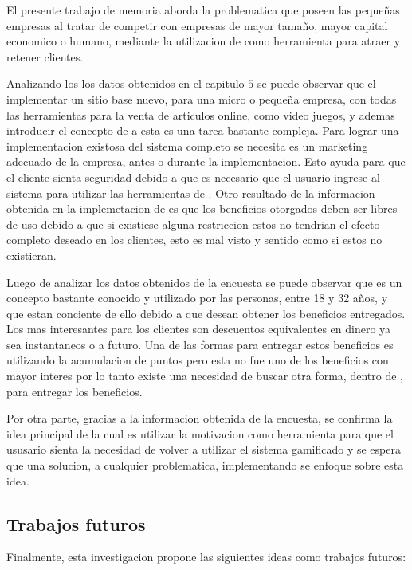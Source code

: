 El presente trabajo de memoria aborda la problematica que poseen las pequeñas empresas al tratar
de competir con empresas de mayor tamaño, mayor capital economico o humano, mediante la utilizacion
de {\GAM} como herramienta para atraer y retener clientes.

Analizando los los datos obtenidos en el capitulo $5$ se puede observar que el implementar un sitio base 
nuevo, para una micro o pequeña empresa, con todas las herramientas para la venta de articulos online, 
como video juegos, y ademas introducir el concepto de {\GAM} a esta es una tarea bastante compleja. 
Para lograr una implementacion existosa del sistema completo se necesita es un marketing adecuado 
de la empresa, antes o durante la implementacion. Esto ayuda para que el cliente sienta seguridad
debido a que es necesario que el usuario ingrese al sistema para utilizar las herramientas de {\GAM}.
Otro resultado de la informacion obtenida en la implemetacion de {\GAM} es que los beneficios otorgados
deben ser libres de uso debido a que si existiese alguna restriccion estos no tendrian el efecto completo
deseado en los clientes, esto es mal visto y sentido como si estos no existieran.     

Luego de analizar los datos obtenidos de la encuesta se puede observar que {\GAM} es un concepto bastante
conocido y utilizado por las personas, entre 18 y 32 años, y que estan conciente de ello debido a que
desean obtener los beneficios entregados. Los mas interesantes para los clientes son descuentos equivalentes
en dinero ya sea instantaneos o a futuro. Una de las formas para entregar estos beneficios es utilizando la 
acumulacion de puntos pero esta no fue uno de los beneficios con mayor interes por lo tanto existe una
necesidad de buscar otra forma, dentro de {\GAM}, para entregar los beneficios.

Por otra parte, gracias a la informacion obtenida de la encuesta, se confirma la idea principal de {\GAM} la
cual es utilizar la motivacion como herramienta para que el ususario sienta la necesidad de volver
a utilizar el sistema gamificado y se espera que una solucion, a cualquier problematica, implementando 
{\GAM} se enfoque sobre esta idea.

\subsection{Trabajos futuros}
Finalmente, esta investigacion propone las siguientes ideas como trabajos futuros:

